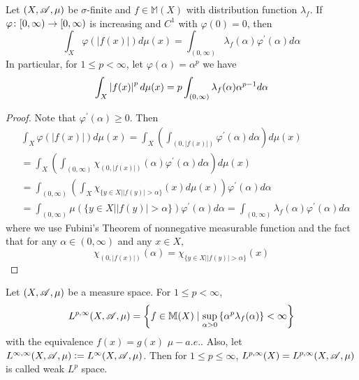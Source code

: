 \begin{thm}
	Let $(X,\mathscr{A},\mu)$ be $\sigma$-finite and $f \in \mathbb{M}(X)$ with distribution function $\lambda_f$. If $\varphi \colon [0,\infty) \rightarrow [0,\infty)$ is increasing and $C^1$ with $\varphi(0) = 0$, then
	\begin{equation*}
		\int_X \varphi(|f(x)|) d \mu(x)=\int_{(0, \infty)} \lambda_f(\alpha) \varphi^{\prime}(\alpha) d \alpha
	\end{equation*}
	In particular, for $1 \leq p < \infty$, let $\varphi(\alpha) = \alpha^p$ we have
	\begin{equation*}
		\int_X \left\lvert f(x)\right\lvert^pd\mu(x) = p \int_{(0,\infty)} \lambda_f(\alpha)\alpha^{p-1}d\alpha
	\end{equation*}	
\end{thm}
\begin{proof}
	Note that $\varphi^\prime(\alpha) \geq 0$. Then
	\begin{equation*}
		\begin{aligned}
			& \int_X \varphi(|f(x)|) d \mu(x)=\int_X\left(\int_{(0,|f(x)|)} \varphi^{\prime}(\alpha) d \alpha\right) d \mu(x) \\
			& =\int_X\left(\int_{(0, \infty)} \chi_{(0,|f(x)|)}(\alpha) \varphi^{\prime}(\alpha) d \alpha\right) d \mu(x) \\
			& =\int_{(0, \infty)}\left(\int_X \chi_{\{y \in X| | f(y) \mid>\alpha\}}(x) d \mu(x)\right) \varphi^{\prime}(\alpha) d \alpha \\
			& =\int_{(0, \infty)} \mu(\{y \in X| | f(y) \mid>\alpha\}) \varphi^{\prime}(\alpha) d \alpha=\int_{(0, \infty)} \lambda_f(\alpha) \varphi^{\prime}(\alpha) d \alpha
		\end{aligned}
	\end{equation*}
	where we use Fubini's Theorem of nonnegative measurable function and the fact that for any $\alpha \in (0, \infty)$ and any $x \in X$,
	\begin{equation*}
		\chi_{(0,|f(x)|)}(\alpha)=\chi_{\{y \in X| | f(y) \mid>\alpha\}}(x)
	\end{equation*}
\end{proof}

\begin{defn}
	Let $(X,\mathscr{A},\mu)$ be a measure space. For $1 \leq p < \infty$,
	\begin{equation*}
		L^{p,\infty}(X,\mathscr{A},\mu) = \left\{f \in \mathbb{M}(X) \mid \sup _{\alpha>0}\left\{\alpha^p \lambda_f(\alpha)\right\}<\infty\right\}
	\end{equation*}
	with the equivalence $f(x) = g(x)$ $\mu-a.e.$. Also, let $L^{\infty,\infty}(X,\mathscr{A},\mu) \vcentcolon= L^{\infty}(X,\mathscr{A},\mu)$. Then for $1 \leq p \leq \infty$, $L^{p,\infty}(X) = L^{p,\infty}(X,\mathscr{A},\mu)$ is called weak $L^p$ space.
\end{defn}

